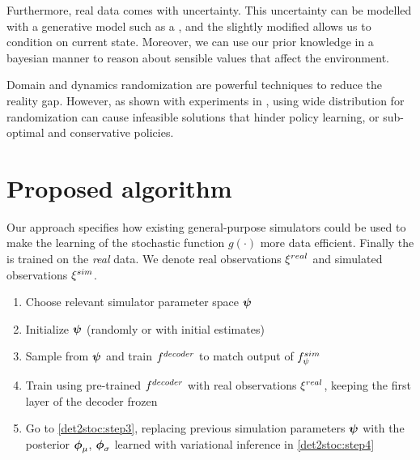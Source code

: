 Furthermore, real data comes with uncertainty. This uncertainty can be modelled with a generative model such as a \vae{}, and the slightly modified \cvae{} allows us to condition on current state. Moreover, we can use our prior knowledge in a bayesian manner to reason about sensible values that affect the environment.

Domain and dynamics randomization are powerful techniques to reduce the reality gap. However, as shown with experiments in \parencite{Chebotar2018}, using wide distribution for randomization can cause infeasible solutions that hinder policy learning, or sub-optimal and conservative policies.


\section{Proposed \dettostoc{} algorithm}
\label{det2stoc:algorithm}

Our approach specifies how existing general-purpose simulators could be used to make the learning of the stochastic function $g(\cdot)$ more data efficient. Finally the \cvae{} is trained on the \emph{real} data. We denote real observations $\xi^{real}$ and simulated observations $\xi^{sim}$.


\begin{enumerate}[label=\textit{Step \arabic*}]
    \item \label{det2stoc:step1} Choose relevant simulator parameter space $\boldsymbol{\psi}$
    \item \label{det2stoc:step2} Initialize $\boldsymbol{\psi}$ (randomly or with initial estimates)
    \item \label{det2stoc:step3} Sample from $\boldsymbol{\psi}$ and train $f^{decoder}{}$ to match output of $f^{sim}_{\psi}{}$ 
    \item \label{det2stoc:step4} Train \cvae{} using pre-trained $f^{decoder}{}$ with real observations $\xi^{real}$, keeping the first layer of the decoder frozen

    \item \label{det2stoc:step5} Go to \ref{det2stoc:step3}, replacing previous simulation parameters $\boldsymbol{\psi}$ with the posterior $\boldsymbol{\phi}_{\mu}$, $\boldsymbol{\phi}_{\sigma}$ learned with variational inference in \ref{det2stoc:step4}
\end{enumerate}


